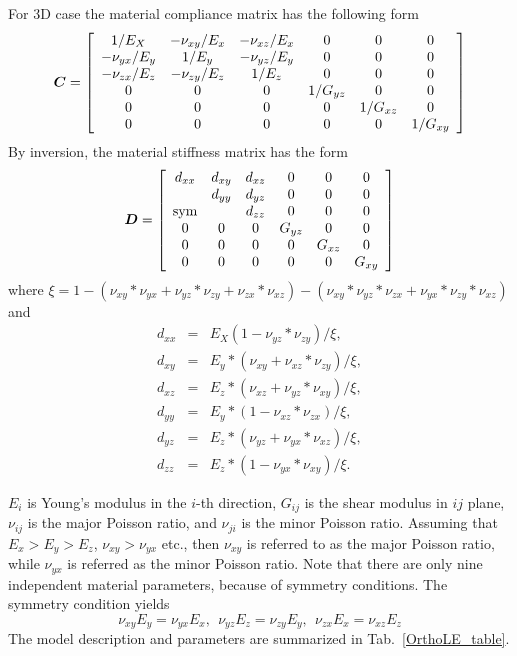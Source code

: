 \documentclass[a4paper]{article}
\newcommand{\mbf}[1]{\mbox{\boldmath$#1$}}
\begin{document}
For 3D case the material compliance matrix has the following form
\begin{equation}
  \mbf{C}=\left[\begin{array}{cccccc}
1/E_X & -\nu_{xy}/E_x& -\nu_{xz}/E_x& 0& 0&0\\
-\nu_{yx}/E_y & 1/E_y& -\nu_{yz}/E_y& 0& 0&0\\
-\nu_{zx}/E_z & -\nu_{zy}/E_z& 1/E_z& 0& 0&0\\
0 & 0 & 0 & 1/G_{yz} & 0 & 0\\
0 & 0 & 0 & 0 & 1/G_{xz} & 0\\
0 & 0 & 0 & 0 & 0 & 1/G_{xy}
 \end{array}\right]
\end{equation}
By inversion, the material stiffness matrix has the form
\begin{equation}
  \mbf{D}=\left[\begin{array}{cccccc}
d_{xx} & d_{xy} & d_{xz} & 0 & 0 & 0\\
& d_{yy} & d_{yz} & 0 & 0 & 0\\
\rm {sym} & & d_{zz} & 0 & 0 & 0\\
0 & 0 & 0 & G_{yz} & 0 & 0\\
0 & 0 & 0 & 0 & G_{xz} & 0\\
0 & 0 & 0 & 0 & 0 & G_{xy}
 \end{array}\right]
\end{equation}
where $\xi=1-(\nu_{xy}*\nu_{yx}+\nu_{yz}*\nu_{zy}+\nu_{zx}*\nu_{xz})-(\nu_{xy}*\nu_{yz}*\nu_{zx}+\nu_{yx}*\nu_{zy}*\nu_{xz})$ and
\begin{eqnarray}
  d_{xx}&=&E_X(1-\nu_{yz}*\nu_{zy})/\xi,\\
  d_{xy}&=&E_y*(\nu_{xy}+\nu_{xz}*\nu_{zy})/\xi,\\
  d_{xz}&=&E_z*(\nu_{xz}+\nu_{yz}*\nu_{xy})/\xi,\\
  d_{yy}&=&E_y*(1-\nu_{xz}*\nu_{zx})/\xi,\\
  d_{yz}&=&E_z*(\nu_{yz}+\nu_{yx}*\nu_{xz})/\xi,\\
  d_{zz}&=&E_z*(1-\nu_{yx}*\nu_{xy})/\xi.
\end{eqnarray}


 $E_i$ is Young's modulus in the $i$-th direction, $G_{ij}$ is the shear modulus in $ij$ plane, $\nu_{ij}$ is the major Poisson ratio, and $\nu_{ji}$ is the minor Poisson ratio. Assuming that $E_x>E_y>E_z$, $\nu_{xy} > \nu_{yx}$ etc., then $\nu_{xy}$ is referred to as the major Poisson ratio, while $\nu_{yx}$ is referred as the minor Poisson ratio.
Note that there are only nine independent material parameters,
because of symmetry conditions. The symmetry condition yields
$$\nu_{xy}E_y=\nu_{yx}E_x,\ \ \nu_{yz}E_z=\nu_{zy}E_y,\ \ \nu_{zx}E_x=\nu_{xz}E_z$$
The model description and parameters are summarized
in Tab.~\ref{OrthoLE_table}.
\end{document}
